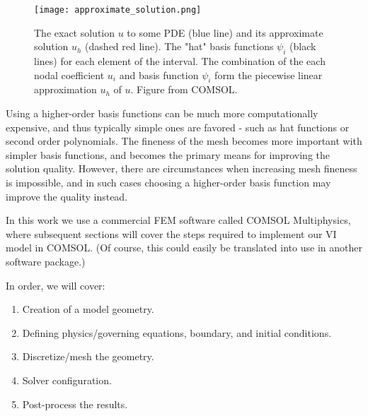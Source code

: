 \begin{figure}[htb!]
  \centering
  \texttt{[image: approximate\_solution.png]}
  \caption[Basis functions are used to approximate the FEM solution to a PDE.]{The exact solution $u$ to some PDE (blue line) and its approximate solution $u_h$ (dashed red line). The "hat" basis functions $\psi_i$ (black lines) for each element of the interval. The combination of the each nodal coefficient $u_i$ and basis function $\psi_i$ form the piecewise linear approximation $u_h$ of $u$. Figure from COMSOL\cite{noauthor_detailed_nodate}.}
  \label{fig:approximate_solution}
\end{figure}

Using a higher-order basis functions can be much more computationally expensive, and thus typically simple ones are favored - such as hat functions or second order polynomials.
The fineness of the mesh becomes more important with simpler basis functions, and becomes the primary means for improving the solution quality.
However, there are circumstances when increasing mesh fineness is impossible, and in such cases choosing a higher-order basis function may improve the quality instead.\par

In this work we use a commercial FEM software called COMSOL Multiphysics, where subsequent sections will cover the steps required to implement our VI model in COMSOL.
(Of course, this could easily be translated into use in another software package.)\par

In order, we will cover:
\begin{enumerate}
  \item Creation of a model geometry.
  \item Defining physics/governing equations, boundary, and initial conditions.
  \item Discretize/mesh the geometry.
  \item Solver configuration.
  \item Post-process the results.
\end{enumerate}
